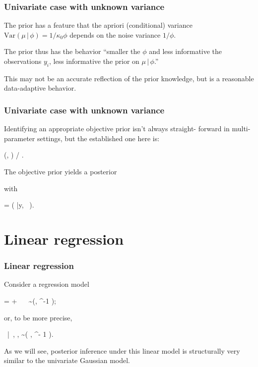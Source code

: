 \documentclass[18pt, handout]{beamer}
\newcommand{\defineTightItemizeSpacing}{%
	\setlength{\abovedisplayskip}{.25\baselineskip}%
	\setlength{\belowdisplayskip}{.25\baselineskip}%
}
\newenvironment{tightEquation*}{%
	\defineTightItemizeSpacing%
	\begin{equation*}
}{
	\end{equation*} \ignorespacesafterend
}
\newcommand{\given}{\, | \,}
\newcommand{\thinnerspace}{\mskip.5\thinmuskip}
\newcommand{\expectation}{\mathbb{E}}
\newcommand{\variance}{\mathrm{Var}}
\newcommand{\normalDist}{\mathcal{N}}
\newcommand{\gammaDist}{\mathrm{Gamma}}
\newcommand{\bX}{\bm{X}}
\begin{document}
\begin{frame}
\frametitle{Univariate case with unknown variance}
The prior has a feature that the apriori (conditional) variance $\variance(\mu \given \phi) = 1 / \kappa_0 \phi$ depends on the noise variance $1 / \phi$.

\smallskip
The prior thus has the behavior ``smaller the $\phi$ and less informative the observations $y_i$, less informative the prior on $\mu \given \phi$.''

\smallskip
This may not be an accurate reflection of the prior knowledge, but is a reasonable data-adaptive behavior.
\end{frame}


\begin{frame}
\frametitle{Univariate case with unknown variance}
Identifying an appropriate objective prior isn't always straight- forward in multi-parameter settings, but the established one here is:
\begin{tightEquation*}
\pi(\mu, \phi)  / \phi.
\end{tightEquation*}

The objective prior yields a posterior
with
\begin{tightEquation*}
\expectation\!\left[ 
	(\mu, \phi) \given \bm{y}
\right]
	= \left( 
		\bar{y}, \, 
	\right).
\end{tightEquation*}
\end{frame}


\section{Linear regression}

\newcommand{\bbeta}{\bm{\beta}}
\newcommand{\bPhi}{\bm{\Phi}}
\newcommand{\bSigma}{\bm{\Sigma}}
\newcommand{\minus}{\scalebox{1.0}[1.0]{{\scriptsize -}}}
\begin{frame}
\frametitle{Linear regression}
Consider a regression model
\begin{tightEquation*}
 = \bX \bbeta + \bm{\epsilon} 
	\  \,
	\bm{\epsilon} \sim \normalDist\!\left(\bm{0}, \phi^{-1} \bm{I} \right);
\end{tightEquation*}
or, to be more precise, 
\begin{tightEquation*}
 \given \bX, \bbeta, \phi
	\sim \normalDist\!\left( \bX \bbeta, \phi^{- 1}  \right).
\end{tightEquation*}

As we will see, posterior inference under this linear model is structurally very similar to the univariate Gaussian model.
\end{frame}
\end{document}

